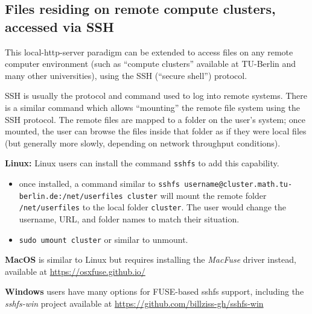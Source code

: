 
\hypertarget{simwrapper-files-residing-on-the-university-compute-cluster-accessed-via-ssh}{%
\subsection{Files residing on remote compute clusters, accessed via SSH}
\label{simwrapper-files-residing-on-the-university-compute-cluster-accessed-via-ssh}}

This local-http-server paradigm can be extended to access files on any remote computer environment (such as ``compute clusters'' available at TU-Berlin and many other universities), using the SSH (``secure shell'') protocol.

SSH is usually the protocol and command used to log into remote systems. There is a similar command which allows ``mounting'' the remote file system using the SSH protocol. The remote files are mapped to a folder on the user's system; once mounted, the user can browse the files inside that folder as if they were local files (but generally more slowly, depending on network throughput conditions).

\textbf{Linux:} Linux users can install the command \texttt{sshfs} to add this capability.

\begin{itemize}
\item
  once installed, a command similar to
  \texttt{sshfs\ username@cluster.math.tu-berlin.de:/net/userfiles\ cluster}
  will mount the remote folder \texttt{/net/userfiles} to the local
  folder \texttt{cluster}. The user would change the username, URL, and
  folder names to match their situation.
\item
  \texttt{sudo\ umount\ cluster} or similar to unmount.
\end{itemize}

\textbf{MacOS} is similar to Linux but requires installing the \emph{MacFuse} driver instead, available at \url{https://osxfuse.github.io/}

\textbf{Windows} users have many options for FUSE-based sshfs support, including the \emph{sshfs-win} project available at \url{https://github.com/billziss-gh/sshfs-win}


